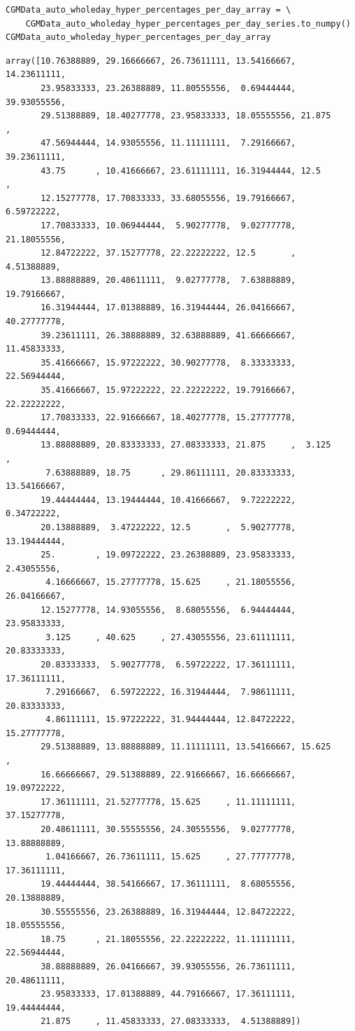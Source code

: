 \begin{verbatim}
CGMData_auto_wholeday_hyper_percentages_per_day_array = \
    CGMData_auto_wholeday_hyper_percentages_per_day_series.to_numpy()
CGMData_auto_wholeday_hyper_percentages_per_day_array
\end{verbatim}

\begin{verbatim}
array([10.76388889, 29.16666667, 26.73611111, 13.54166667, 14.23611111,
       23.95833333, 23.26388889, 11.80555556,  0.69444444, 39.93055556,
       29.51388889, 18.40277778, 23.95833333, 18.05555556, 21.875     ,
       47.56944444, 14.93055556, 11.11111111,  7.29166667, 39.23611111,
       43.75      , 10.41666667, 23.61111111, 16.31944444, 12.5       ,
       12.15277778, 17.70833333, 33.68055556, 19.79166667,  6.59722222,
       17.70833333, 10.06944444,  5.90277778,  9.02777778, 21.18055556,
       12.84722222, 37.15277778, 22.22222222, 12.5       ,  4.51388889,
       13.88888889, 20.48611111,  9.02777778,  7.63888889, 19.79166667,
       16.31944444, 17.01388889, 16.31944444, 26.04166667, 40.27777778,
       39.23611111, 26.38888889, 32.63888889, 41.66666667, 11.45833333,
       35.41666667, 15.97222222, 30.90277778,  8.33333333, 22.56944444,
       35.41666667, 15.97222222, 22.22222222, 19.79166667, 22.22222222,
       17.70833333, 22.91666667, 18.40277778, 15.27777778,  0.69444444,
       13.88888889, 20.83333333, 27.08333333, 21.875     ,  3.125     ,
        7.63888889, 18.75      , 29.86111111, 20.83333333, 13.54166667,
       19.44444444, 13.19444444, 10.41666667,  9.72222222,  0.34722222,
       20.13888889,  3.47222222, 12.5       ,  5.90277778, 13.19444444,
       25.        , 19.09722222, 23.26388889, 23.95833333,  2.43055556,
        4.16666667, 15.27777778, 15.625     , 21.18055556, 26.04166667,
       12.15277778, 14.93055556,  8.68055556,  6.94444444, 23.95833333,
        3.125     , 40.625     , 27.43055556, 23.61111111, 20.83333333,
       20.83333333,  5.90277778,  6.59722222, 17.36111111, 17.36111111,
        7.29166667,  6.59722222, 16.31944444,  7.98611111, 20.83333333,
        4.86111111, 15.97222222, 31.94444444, 12.84722222, 15.27777778,
       29.51388889, 13.88888889, 11.11111111, 13.54166667, 15.625     ,
       16.66666667, 29.51388889, 22.91666667, 16.66666667, 19.09722222,
       17.36111111, 21.52777778, 15.625     , 11.11111111, 37.15277778,
       20.48611111, 30.55555556, 24.30555556,  9.02777778, 13.88888889,
        1.04166667, 26.73611111, 15.625     , 27.77777778, 17.36111111,
       19.44444444, 38.54166667, 17.36111111,  8.68055556, 20.13888889,
       30.55555556, 23.26388889, 16.31944444, 12.84722222, 18.05555556,
       18.75      , 21.18055556, 22.22222222, 11.11111111, 22.56944444,
       38.88888889, 26.04166667, 39.93055556, 26.73611111, 20.48611111,
       23.95833333, 17.01388889, 44.79166667, 17.36111111, 19.44444444,
       21.875     , 11.45833333, 27.08333333,  4.51388889])
\end{verbatim}

